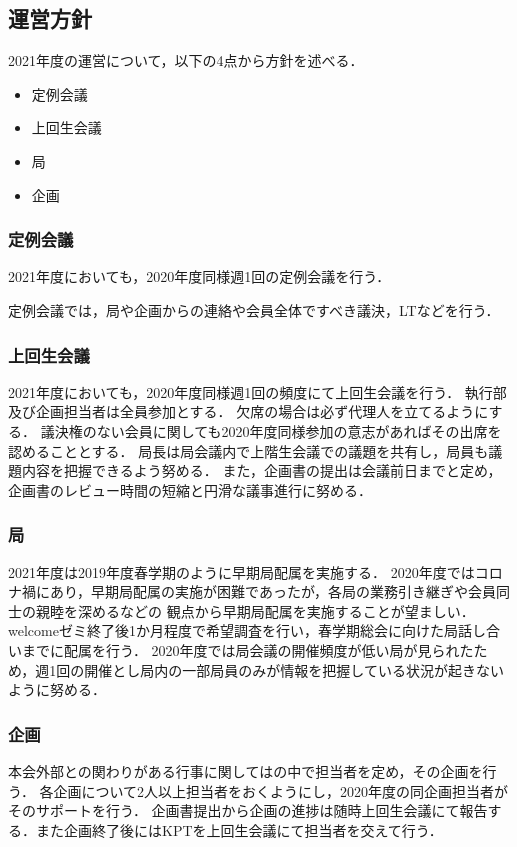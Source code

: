 \subsection*{運営方針}


2021年度の運営について，以下の4点から方針を述べる．
\begin{itemize}
    \item 定例会議
    \item 上回生会議
    \item 局
    \item 企画
\end{itemize}

\subsubsection*{定例会議}
2021年度においても，2020年度同様週1回の定例会議を行う．

定例会議では，局や企画からの連絡や会員全体ですべき議決，LTなどを行う．

\subsubsection*{上回生会議}
2021年度においても，2020年度同様週1回の頻度にて上回生会議を行う．
執行部及び企画担当者は全員参加とする．
欠席の場合は必ず代理人を立てるようにする．
議決権のない会員に関しても2020年度同様参加の意志があればその出席を認めることとする．
局長は局会議内で上階生会議での議題を共有し，局員も議題内容を把握できるよう努める．
また，企画書の提出は会議前日までと定め，企画書のレビュー時間の短縮と円滑な議事進行に努める．

\subsubsection*{局}
2021年度は2019年度春学期のように早期局配属を実施する．
2020年度ではコロナ禍にあり，早期局配属の実施が困難であったが，各局の業務引き継ぎや会員同士の親睦を深めるなどの
観点から早期局配属を実施することが望ましい．
welcomeゼミ終了後1か月程度で希望調査を行い，春学期総会に向けた局話し合いまでに配属を行う．
2020年度では局会議の開催頻度が低い局が見られたため，週1回の開催とし局内の一部局員のみが情報を把握している状況が起きないように努める．

\subsubsection*{企画}
本会外部との関わりがある行事に関しては\secondGrade{}の中で担当者を定め，その企画を行う．
各企画について2人以上担当者をおくようにし，2020年度の同企画担当者がそのサポートを行う．
企画書提出から企画の進捗は随時上回生会議にて報告する．また企画終了後にはKPTを上回生会議にて担当者を交えて行う．
